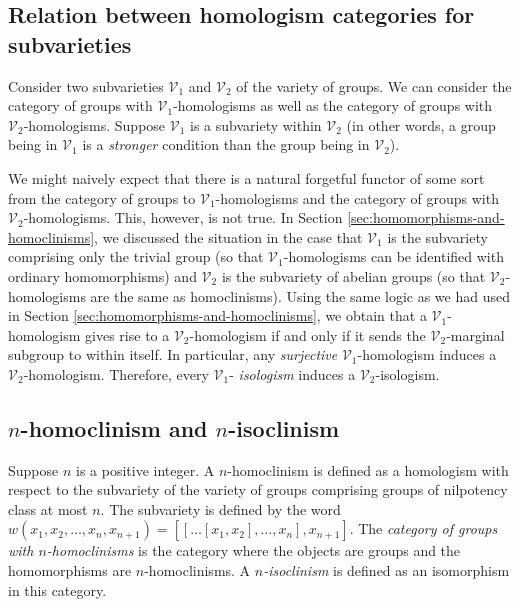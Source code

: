 \subsection{Relation between homologism categories for subvarieties}

Consider two subvarieties $\mathcal{V}_1$ and $\mathcal{V}_2$ of the
variety of groups. We can consider the category of groups with
$\mathcal{V}_1$-homologisms as well as the category of groups with
$\mathcal{V}_2$-homologisms. Suppose $\mathcal{V}_1$ is a subvariety
within $\mathcal{V}_2$ (in other words, a group being in
$\mathcal{V}_1$ is a {\em stronger} condition than the group being in
$\mathcal{V}_2$).

We might naively expect that there is a natural forgetful functor of
some sort from the category of groups to $\mathcal{V}_1$-homologisms
and the category of groups with $\mathcal{V}_2$-homologisms. This,
however, is not true. In Section
\ref{sec:homomorphisms-and-homoclinisms}, we discussed the situation
in the case that $\mathcal{V}_1$ is the subvariety comprising only the
trivial group (so that $\mathcal{V}_1$-homologisms can be identified
with ordinary homomorphisms) and $\mathcal{V}_2$ is the subvariety of
abelian groups (so that $\mathcal{V}_2$-homologisms are the same as
homoclinisms). Using the same logic as we had used in Section
\ref{sec:homomorphisms-and-homoclinisms}, we obtain that a
$\mathcal{V}_1$-homologism gives rise to a $\mathcal{V}_2$-homologism
if and only if it sends the $\mathcal{V}_2$-marginal subgroup to
within itself. In particular, any {\em surjective}
$\mathcal{V}_1$-homologism induces a
$\mathcal{V}_2$-homologism. Therefore, every $\mathcal{V}_1$-{\em
  isologism} induces a $\mathcal{V}_2$-isologism.

\subsection{$n$-homoclinism and $n$-isoclinism}\label{appsec:n-homoclinism}

Suppose $n$ is a positive integer. A $n$-homoclinism is defined as a
homologism with respect to the subvariety of the variety of groups
comprising groups of nilpotency class at most $n$. The subvariety is
defined by the word $w(x_1,x_2,\dots,x_n,x_{n+1}) = [[ \dots
    [x_1,x_2],\dots,x_n],x_{n+1}]$. The {\em category of groups with
  $n$-homoclinisms} is the category where the objects are groups and
the homomorphisms are $n$-homoclinisms. A {\em $n$-isoclinism} is
defined as an isomorphism in this category.


